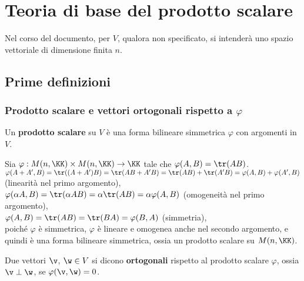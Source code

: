 \chapter{Teoria di base del prodotto scalare}

\begin{note}
	Nel corso del documento, per $V$, qualora non specificato, si intenderà uno spazio vettoriale di dimensione
	finita $n$.
\end{note}

\section{Prime definizioni}

\subsection{Prodotto scalare e vettori ortogonali rispetto a \texorpdfstring{$\varphi$}{φ}}

\begin{definition} 
	Un \textbf{prodotto scalare} su $V$ è una forma bilineare simmetrica $\varphi$ con argomenti in $V$.
\end{definition}

\begin{example}
	Sia $\varphi : M(n, \KK) \times M(n, \KK) \to \KK$ tale che $\varphi(A, B) = \tr(AB)$. \\
	
	\li $\varphi(A + A', B) = \tr((A + A')B) = \tr(AB + A'B) = \tr(AB) + \tr(A'B) = \varphi(A, B) + \varphi(A', B)$ (linearità
	nel primo argomento), \\
	\li $\varphi(\alpha A, B) = \tr(\alpha A B) = \alpha \tr(AB) = \alpha \varphi(A, B)$ (omogeneità nel primo argomento), \\
	\li $\varphi(A, B) = \tr(AB) = \tr(BA) = \varphi(B, A)$ (simmetria), \\
	\li poiché $\varphi$ è simmetrica, $\varphi$ è lineare e omogenea anche nel secondo argomento, e quindi è una
	forma bilineare simmetrica, ossia un prodotto scalare su $M(n, \KK)$.
\end{example}

\begin{definition} 
	Due vettori $\v$, $\w \in V$ si dicono \textbf{ortogonali} rispetto al prodotto scalare $\varphi$, ossia $\v \perp \w$, se $\varphi(\v, \w) = 0$.
\end{definition}

